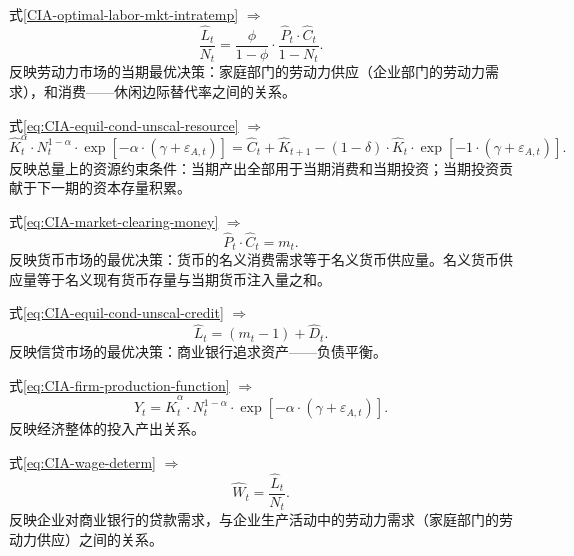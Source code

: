 式\eqref{CIA-optimal-labor-mkt-intratemp} $\Rightarrow$
\begin{equation}
  \label{CIA-optimal-labor-mkt-intratemp-scal}
  \frac{\hat{L}_t}{N_t}=\frac{\phi}{1-\phi} \cdot \frac{\hat{P}_t \cdot \hat{C}_t}{1-N_t}.
\end{equation}
反映劳动力市场的当期最优决策：家庭部门的劳动力供应（企业部门的劳动力需求），和消费——休闲边际替代率之间的关系。

式\eqref{eq:CIA-equil-cond-unscal-resource} $\Rightarrow$
\begin{equation}
  \label{eq:CIA-equil-cond-scal-resource}
  \hat{K}_t^{\alpha} \cdot N_t^{1-\alpha} \cdot \exp \left[ -\alpha \cdot \left( \gamma + \varepsilon_{A,t} \right) \right] = \hat{C}_t + \hat{K}_{t+1} -  (1-\delta) \cdot \hat{K}_t \cdot \exp \left[
  -1 \cdot \left( \gamma + \varepsilon_{A,t} \right)
  \right].
\end{equation}
反映总量上的资源约束条件：当期产出全部用于当期消费和当期投资；当期投资贡献于下一期的资本存量积累。

式\eqref{eq:CIA-market-clearing-money} $\Rightarrow$
\begin{equation}
  \label{eq:CIA-market-clearing-money-scal}
  \hat{P}_t \cdot \hat{C}_t = m_t.
\end{equation}
反映货币市场的最优决策：货币的名义消费需求等于名义货币供应量。名义货币供应量等于名义现有货币存量与当期货币注入量之和。

式\eqref{eq:CIA-equil-cond-unscal-credit} $\Rightarrow$
\begin{equation}
  \label{eq:CIA-equil-cond-scal-credit}
  \hat{L}_t = \left( m_t - 1 \right) + \hat{D}_t.
\end{equation}
反映信贷市场的最优决策：商业银行追求资产——负债平衡。

式\eqref{eq:CIA-firm-production-function} $\Rightarrow$
\begin{equation}
  \label{eq:CIA-firm-production-function-scal}
  \hat{Y}_t = \hat{K}_t^{\alpha} \cdot N_t^{1-\alpha} \cdot \exp \left[ - \alpha \cdot \left( \gamma + \varepsilon_{A,t} \right) \right].
\end{equation}
反映经济整体的投入产出关系。

式\eqref{eq:CIA-wage-determ} $\Rightarrow$
\begin{equation}
  \label{eq:CIA-wage-determ-scal}
  \hat{W}_t = \frac{\hat{L}_t}{N_t}.
\end{equation}
反映企业对商业银行的贷款需求，与企业生产活动中的劳动力需求（家庭部门的劳动力供应）之间的关系。


